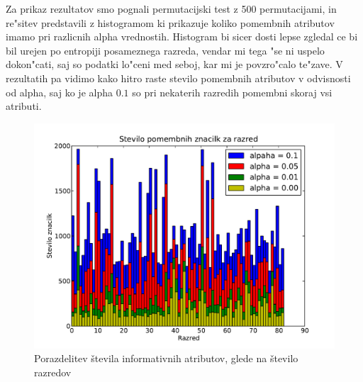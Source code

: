\documentclass[a4paper,11pt]{article}
\begin{document}
Za prikaz rezultatov smo pognali permutacijski test z 500 permutacijami, in re"sitev predstavili z histogramom ki prikazuje koliko pomembnih atributov imamo pri razlicnih alpha vrednostih. Histogram bi sicer dosti lepse zgledal ce bi bil urejen po entropiji posameznega razreda, vendar mi tega "se ni uspelo dokon"cati, saj so podatki lo"ceni med seboj, kar mi je povzro"calo te"zave. V rezultatih pa vidimo kako hitro raste stevilo pomembnih atributov v odvisnosti od alpha, saj ko je alpha $0.1$ so pri nekaterih razredih pomembni skoraj vsi atributi. 
\begin{figure}[H]
\begin{center}
\includegraphics[scale=0.6]{mu.pdf}
\caption{Porazdelitev števila informativnih atributov, glede na število razredov}
\label{slika1}
\end{center}
\end{figure}\ \\[-40pt]
\end{document}
